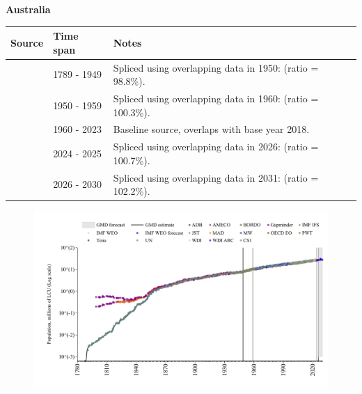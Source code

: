 \documentclass[12pt,a4paper,landscape]{article}
\begin{document}
\begin{adjustbox}{max totalsize={\paperwidth}{\paperheight},center}
\begin{minipage}[t][\textheight][t]{\textwidth}
\vspace*{0.5cm}
{}
\begin{center}
{\Large\bfseries Australia}
\end{center}
\vspace{0.5cm}
\begin{table}[H]
\centering
\small
\begin{tabular}{|l|l|l|}
\hline
\textbf{Source} & \textbf{Time span} & \textbf{Notes} \\
\hline
\rowcolor{white}\cite{CS1_AUS}& 1789 - 1949 &Spliced using overlapping data in 1950: (ratio = 98.8\%).\\
\rowcolor{lightgray}\cite{IMF_IFS}& 1950 - 1959 &Spliced using overlapping data in 1960: (ratio = 100.3\%).\\
\rowcolor{white}\cite{WDI}& 1960 - 2023 &Baseline source, overlaps with base year 2018.\\
\rowcolor{lightgray}\cite{OECD_EO}& 2024 - 2025 &Spliced using overlapping data in 2026: (ratio = 100.7\%).\\
\rowcolor{white}\cite{Gapminder}& 2026 - 2030 &Spliced using overlapping data in 2031: (ratio = 102.2\%).\\
\hline
\end{tabular}
\end{table}
\begin{figure}[H]
\centering
\includegraphics[width=\textwidth,height=0.6\textheight,keepaspectratio]{graphs/AUS_pop.pdf}
\end{figure}
\end{minipage}
\end{adjustbox}
\end{document}
